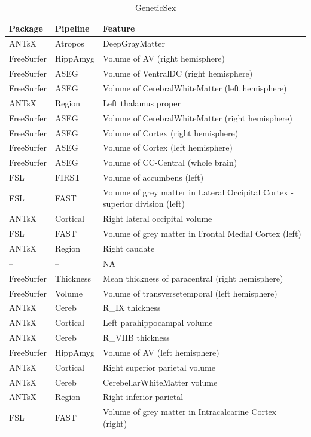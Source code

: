 \documentclass[
  10pt,
]{article}
\begin{document}
\begin{table}

\caption{\label{tab:compare-predictions}GeneticSex}
\centering
\begin{tabular}[t]{lll}
\toprule
Package & Pipeline & Feature\\
\midrule
ANTsX & Atropos & DeepGrayMatter\\
FreeSurfer & HippAmyg & Volume of AV (right hemisphere)\\
FreeSurfer & ASEG & Volume of VentralDC (right hemisphere)\\
FreeSurfer & ASEG & Volume of CerebralWhiteMatter (left hemisphere)\\
ANTsX & Region & Left thalamus proper\\
\addlinespace
FreeSurfer & ASEG & Volume of CerebralWhiteMatter (right hemisphere)\\
FreeSurfer & ASEG & Volume of Cortex (right hemisphere)\\
FreeSurfer & ASEG & Volume of Cortex (left hemisphere)\\
FreeSurfer & ASEG & Volume of CC-Central (whole brain)\\
FSL & FIRST & Volume of accumbens (left)\\
\addlinespace
FSL & FAST & Volume of grey matter in Lateral Occipital Cortex - superior division (left)\\
ANTsX & Cortical & Right lateral occipital volume\\
FSL & FAST & Volume of grey matter in Frontal Medial Cortex (left)\\
ANTsX & Region & Right caudate\\
-- & -- & NA\\
\addlinespace
FreeSurfer & Thickness & Mean thickness of paracentral (right hemisphere)\\
FreeSurfer & Volume & Volume of transversetemporal (left hemisphere)\\
ANTsX & Cereb & R\_IX thickness\\
ANTsX & Cortical & Left parahippocampal volume\\
ANTsX & Cereb & R\_VIIB thickness\\
\addlinespace
FreeSurfer & HippAmyg & Volume of AV (left hemisphere)\\
ANTsX & Cortical & Right superior parietal volume\\
ANTsX & Cereb & CerebellarWhiteMatter volume\\
ANTsX & Region & Right inferior parietal\\
FSL & FAST & Volume of grey matter in Intracalcarine Cortex (right)\\
\bottomrule
\end{tabular}
\end{table}
\end{document}

